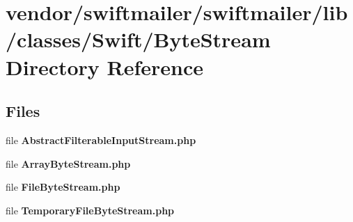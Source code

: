 \section{vendor/swiftmailer/swiftmailer/lib/classes/\+Swift/\+Byte\+Stream Directory Reference}
\label{dir_5baf8cd0340efb722e3aa454b93c0529}
\subsection*{Files}
\begin{DoxyCompactItemize}
\item 
file {\bf Abstract\+Filterable\+Input\+Stream.\+php}
\item 
file {\bf Array\+Byte\+Stream.\+php}
\item 
file {\bf File\+Byte\+Stream.\+php}
\item 
file {\bf Temporary\+File\+Byte\+Stream.\+php}
\end{DoxyCompactItemize}
